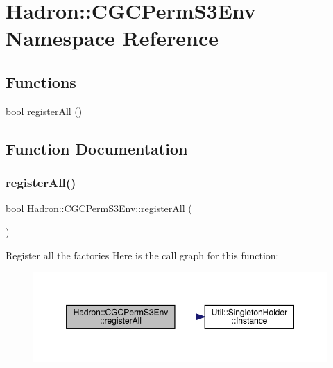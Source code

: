 \hypertarget{namespaceHadron_1_1CGCPermS3Env}{}\section{Hadron\+:\+:C\+G\+C\+Perm\+S3\+Env Namespace Reference}
\label{namespaceHadron_1_1CGCPermS3Env}
\subsection*{Functions}
\begin{DoxyCompactItemize}
\item 
bool \mbox{\hyperlink{namespaceHadron_1_1CGCPermS3Env_af27896ea7c15a1cdc0c664037d8f9a94}{register\+All}} ()
\end{DoxyCompactItemize}


\subsection{Function Documentation}
\mbox{\label{namespaceHadron_1_1CGCPermS3Env_af27896ea7c15a1cdc0c664037d8f9a94}} 
\subsubsection{\texorpdfstring{registerAll()}{registerAll()}}
{\footnotesize\ttfamily bool Hadron\+::\+C\+G\+C\+Perm\+S3\+Env\+::register\+All (\begin{DoxyParamCaption}{ }\end{DoxyParamCaption})}

Register all the factories Here is the call graph for this function\+:\nopagebreak
\begin{figure}[H]
\begin{center}
\leavevmode
\includegraphics[width=350pt]{dc/d06/namespaceHadron_1_1CGCPermS3Env_af27896ea7c15a1cdc0c664037d8f9a94_cgraph}
\end{center}
\end{figure}
